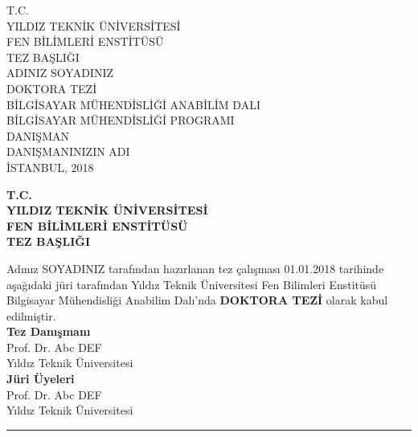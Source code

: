 \documentclass[a4paper,12pt]{report}
\begin{document}
\shorthandoff{=}%
\shorthandon{=}
\begin{titlepage}
\begin{center}
\begin{singlespacing}
\large T.C. \\ YILDIZ TEKNİK ÜNİVERSİTESİ\\FEN BİLİMLERİ ENSTİTÜSÜ\\[4cm]
\large TEZ BAŞLIĞI\\[5cm]
\large ADINIZ SOYADINIZ\\[3cm]
\large DOKTORA TEZİ\\BİLGİSAYAR MÜHENDİSLİĞİ ANABİLİM DALI\\BİLGİSAYAR MÜHENDİSLİĞİ PROGRAMI\\[3cm] 
\large DANIŞMAN\\ DANIŞMANINIZIN ADI\\[2cm]
\large İSTANBUL, 2018
\end{singlespacing}
\end{center}
\end{titlepage}
\restoregeometry
\begin{titlepage}
\begin{center}
\bfseries\large T.C. \\ YILDIZ TEKNİK ÜNİVERSİTESİ\\ FEN BİLİMLERİ ENSTİTÜSÜ\\[1.5cm]
\bfseries\large TEZ BAŞLIĞI\\[1.5cm]
\end{center}
\begin{singlespacing}
\textnormal{Adınız SOYADINIZ tarafından hazırlanan tez çalışması 01.01.2018 tarihinde aşağıdaki jüri tarafından Yıldız Teknik Üniversitesi Fen Bilimleri Enstitüsü Bilgisayar Mühendisliği Anabilim Dalı'nda \textbf{DOKTORA TEZİ} olarak kabul edilmiştir.}\\[1cm] 
\textbf{Tez Danışmanı}\\
\textnormal{Prof. Dr. Abc DEF\\ Yıldız Teknik Üniversitesi}\\[1cm]
\textbf{Jüri Üyeleri}\\

\textnormal{Prof. Dr. Abc DEF}\\
\textnormal{Yıldız Teknik Üniversitesi} \hfill \rule{5cm}{1pt}\\[1cm]


\end{singlespacing}
\end{titlepage}
\end{document}
